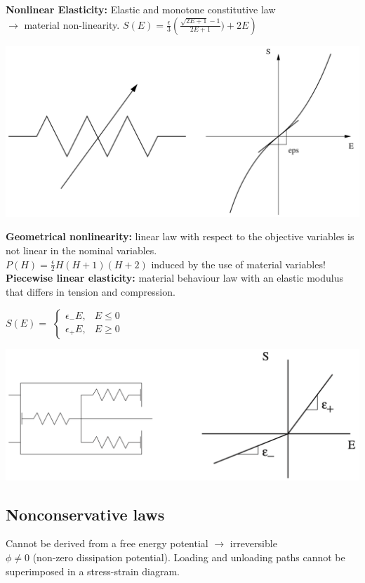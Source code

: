 \textbf{Nonlinear Elasticity:} Elastic and monotone constitutive law \\ $\rightarrow$ material non-linearity.
$S(E) = \frac{\epsilon}{3}\left(\frac{\sqrt{2E + 1}-1}{2E + 1})+2E\right)$
\begin{center}
\includegraphics[width=0.5\linewidth]{img/NonLin} \\
\end{center}
\textbf{Geometrical nonlinearity:} linear law with respect to the objective variables is not linear in the nominal variables. \\
$ P(H) = \frac{\epsilon}{2} H (H+1) (H+2)$ induced by the use of material variables! \\

\textbf{Piecewise linear elasticity:} material behaviour law with an elastic modulus that differs in tension and compression.

$S(E) =$
$\begin{cases} 
\epsilon_{-}E, & E \leqslant 0 \\ \epsilon_{+}E, & E \geqslant 0
\end{cases}$

\begin{center}
\includegraphics[width=0.5\linewidth]{img/PiecLin} \\
\end{center}



\subsection*{Nonconservative laws}
Cannot be derived from a free energy potential $\rightarrow$ irreversible \\
$\phi \neq 0$ (non-zero dissipation potential). Loading and unloading paths cannot be superimposed in a stress-strain diagram.\\

